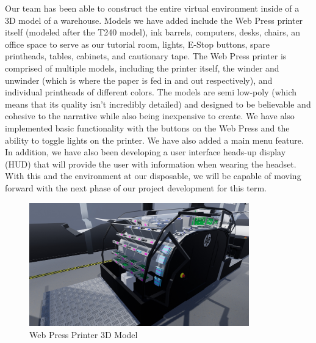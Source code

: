 \documentclass[onecolumn, draftclsnofoot,10pt, compsoc]{IEEEtran}
\begin{document}
\noindent
Our team has been able to construct the entire virtual environment inside of a 3D model of a warehouse. Models we have added include the Web Press printer itself (modeled after the T240 model), ink barrels, computers, desks, chairs, an office space to serve as our tutorial room, lights, E-Stop buttons, spare printheads, tables, cabinets, and cautionary tape. The Web Press printer is comprised of multiple models, including the printer itself, the winder and unwinder (which is where the paper is fed in and out respectively), and individual printheads of different colors. The models are semi low-poly (which means that its quality isn't incredibly detailed) and designed to be believable and cohesive to the narrative while also being inexpensive to create. We have also implemented basic functionality with the buttons on the Web Press and the ability to toggle lights on the printer. We have also added a main menu feature. In addition, we have also been developing a user interface heads-up display (HUD) that will provide the user with information when wearing the headset. With this and the environment at our disposable, we will be capable of moving forward with the next phase of our project development for this term. 

\begin{figure}[ht!]
    \centering
    \includegraphics[width=0.85\textwidth]{press1.png}
    \caption{Web Press Printer 3D Model}
    \label{fig:printerModel}
\end{figure}
\end{document}

